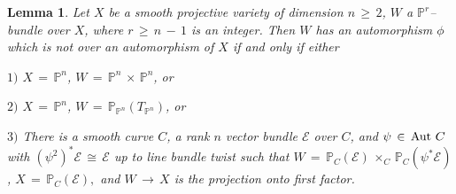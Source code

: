 \documentclass[12pt,reqno]{amsart}
\newtheorem{lemma}{Lemma}[section]
\theoremstyle{definition}
\numberwithin{equation}{section}
\begin{document}
\begin{lemma}\label{auto of Pbundle}
       Let $X$ be a smooth projective variety of dimension $n\, \geq\, 2$, $W$ a $ \mathbb{P}^r$--bundle over $X$, where $ r\, \geq\, n\,-\,1$ is an integer. Then $W$ has an automorphism $\phi$  which is not over an automorphism of $X$ if and only if either
       
       $1)$ $ X\,=\, \mathbb{P}^n$, $ W\,=\, \mathbb{P}^n \,\times\, \mathbb{P}^n$, or

       $2)$ $ X\,=\, \mathbb{P}^n$, $ W\,=\, \mathbb{P}_{\mathbb{P}^n}(T_{\mathbb{P}^n})$, or

       $3)$ There is a smooth curve $C$, a rank $n$ vector bundle $ \mathcal{E}$ over $ C$, and $ \psi\, \in\, \textnormal{Aut} \, \, C$ with $ (\psi^2)^{\ast} \mathcal{E}\, \cong\, \mathcal{E}$ up to line bundle twist such that  $ W\,=\, \mathbb{P}_{C}(\mathcal{E})\, \times_{C}\, \mathbb{P}_{C}(\psi^{\ast}\mathcal{E})$, $ X\,= \,\mathbb{P}_{C}(\mathcal{E}),$ and $ W \,\longrightarrow\, X$ is the projection onto first factor.
        \end{lemma}
\end{document}
